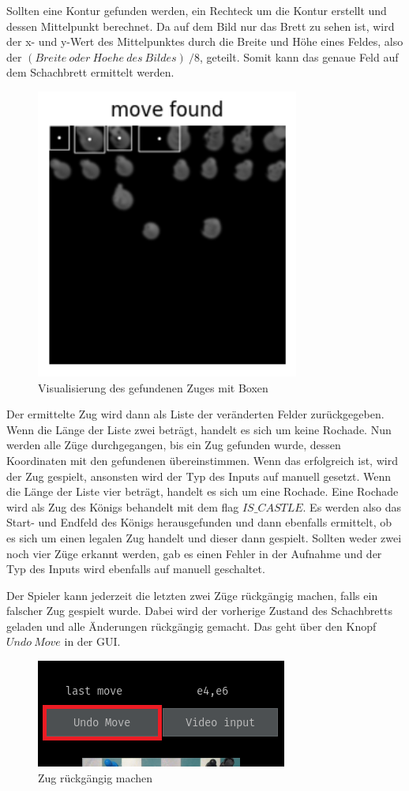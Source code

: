 Sollten eine Kontur gefunden werden, ein Rechteck um die Kontur erstellt und dessen Mittelpunkt berechnet. 
Da auf dem Bild nur das Brett zu sehen ist, wird der x- und y-Wert des Mittelpunktes durch die Breite und Höhe eines Feldes, also der \((Breite~oder~Hoehe~des~Bildes)~/ 8\), 
geteilt. Somit kann das genaue Feld auf dem Schachbrett ermittelt werden. 
\begin{figure}[H]
    \centering
    \includegraphics[scale=0.6]{images/move_found.png}
    \caption{Visualisierung des gefundenen Zuges mit Boxen}
\end{figure} 

Der ermittelte Zug wird dann als Liste der veränderten Felder zurückgegeben. Wenn die Länge der Liste zwei beträgt, handelt es sich um keine Rochade.
Nun werden alle Züge durchgegangen, bis ein Zug gefunden wurde, dessen Koordinaten mit den gefundenen übereinstimmen. Wenn das erfolgreich ist, wird der Zug gespielt, 
ansonsten wird der Typ des Inputs auf manuell gesetzt.
Wenn die Länge der Liste vier beträgt, handelt es sich um eine Rochade. Eine Rochade wird als Zug des Königs behandelt mit dem flag \(IS\_CASTLE\).
Es werden also das Start- und Endfeld des Königs herausgefunden und dann ebenfalls ermittelt, ob es sich um einen legalen Zug handelt und dieser dann gespielt.
Sollten weder zwei noch vier Züge erkannt werden, gab es einen Fehler in der Aufnahme und der Typ des Inputs wird ebenfalls auf manuell geschaltet.

Der Spieler kann jederzeit die letzten zwei Züge rückgängig machen, falls ein falscher Zug gespielt wurde. Dabei wird der vorherige Zustand des Schachbretts geladen und
alle Änderungen rückgängig gemacht. Das geht über den Knopf \(Undo~Move\) in der GUI.
\begin{figure}[H]
    \centering
    \includegraphics[scale=0.6]{images/undo_move.png}
    \caption{Zug rückgängig machen}
\end{figure} 

